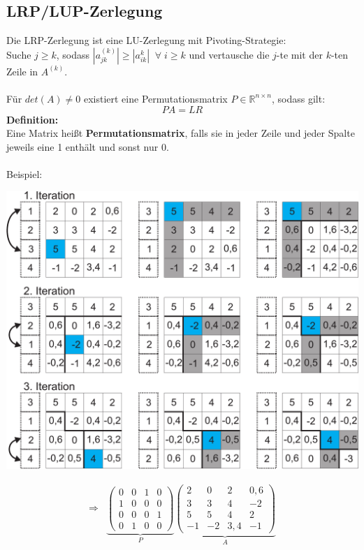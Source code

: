 \documentclass[4pt,a4paper]{scrartcl}
\begin{document}
\begin{multicols}{4}
\subsection{LRP/LUP-Zerlegung}
Die LRP-Zerlegung ist eine LU-Zerlegung mit Pivoting-Strategie:\\
Suche $j\geq k$, sodass $|a_{jk}^{(k)}|\geq |a_{ik}^{k}|\;\;\forall\; i\geq k$ und vertausche die $j$-te mit der $k$-ten Zeile in $A^{(k)}$.\\\\
Für $det(A)\neq 0$ existiert eine Permutationsmatrix $P\in\mathbb{R}^{n\times n}$, sodass gilt:
\begin{equation*}
PA=LR
\end{equation*}
\textbf{Definition:}\\
Eine Matrix heißt \textbf{Permutationsmatrix}, falls sie in jeder Zeile und jeder Spalte jeweils eine 1 enthält und sonst nur 0.\\\\
Beispiel:
\begin{center}
\includegraphics[width=0.95\columnwidth]{Grafiken/LUP-Zerlegung}
\end{center}
\begin{equation*}
\begin{split}
\Rightarrow&\underbrace{\begin{pmatrix}0 & 0 & 1 & 0 \\ 1 & 0 & 0 & 0 \\ 0 & 0 & 0 & 1 \\ 0 & 1 & 0 & 0\end{pmatrix}}_{P}\underbrace{\begin{pmatrix}2 & 0 & 2 & 0,6 \\ 3 & 3 & 4 & -2 \\ 5 & 5 & 4 & 2 \\ -1 & -2 & 3,4 & -1\end{pmatrix}}_{A}\\

\end{split}
\end{equation*}
\end{multicols}
\end{document}

